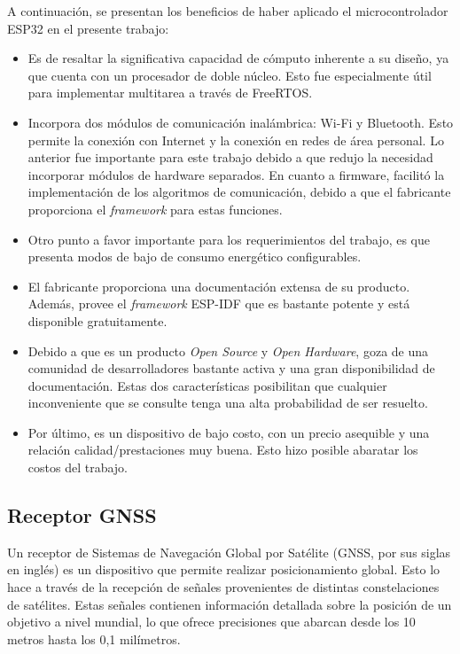 A continuación, se presentan los beneficios de haber aplicado el microcontrolador ESP32 en el presente trabajo:

\begin{itemize}
    \item Es de resaltar la significativa capacidad de cómputo inherente a su diseño, ya que cuenta con un procesador de doble núcleo. Esto fue especialmente útil para implementar multitarea a través de FreeRTOS.
    \item Incorpora dos módulos de comunicación inalámbrica: Wi-Fi y Bluetooth. Esto permite la conexión con Internet y la conexión en redes de área personal. Lo anterior fue importante para este trabajo debido a que redujo la necesidad incorporar módulos de hardware separados. En cuanto a firmware, facilitó la implementación de los algoritmos de comunicación, debido a que el fabricante proporciona el \textit{framework} para estas funciones. 
    \item Otro punto a favor importante para los requerimientos del trabajo, es que presenta modos de bajo de consumo energético configurables. 
    \item El fabricante proporciona una documentación extensa de su producto. Además, provee el \textit{framework} ESP-IDF que es bastante potente y está disponible gratuitamente.  
    \item Debido a que es un producto \textit{Open Source} y \textit{Open Hardware}, goza de una comunidad de desarrolladores bastante activa y una gran disponibilidad de documentación. Estas dos características posibilitan que cualquier inconveniente que se consulte tenga una alta probabilidad de ser resuelto.  
    \item Por último, es un dispositivo de bajo costo, con un precio asequible y una relación calidad/prestaciones muy buena. Esto hizo posible abaratar los costos del trabajo. 
\end{itemize}


\subsection{Receptor GNSS}
\label{sec:QL76}

Un receptor de Sistemas de Navegación Global por Satélite (GNSS, por sus siglas en inglés) es un dispositivo que permite realizar posicionamiento global. Esto lo hace a través de la recepción de señales provenientes de distintas constelaciones de satélites. Estas señales contienen información detallada sobre la posición de un objetivo a nivel mundial, lo que ofrece precisiones que abarcan desde los 10 metros hasta los 0,1 milímetros.  

